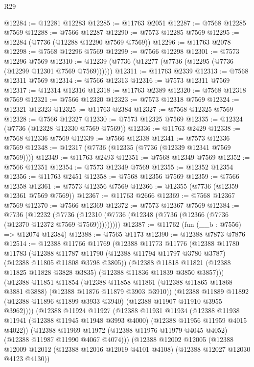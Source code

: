 \begin{lexlean}{R29}
\begin{coremodule}
@12284 := @12281 @12283
@12285 := @11763 @2051
@12287 := @7568 @12285 @7569
@12288 := @7566 @12287
@12290 := @7573 @12285 @7569
@12295 := @12284 (@7736 (@12288 @12290 @7569 @7569))
@12296 := @11763 @2078
@12298 := @7568 @12296 @7569
@12299 := @7566 @12298
@12301 := @7573 @12296 @7569
@12310 := @12239 (@7736 (@12277 (@7736 (@12295 (@7736 (@12299 @12301 @7569 @7569))))))
@12311 := @11763 @2339
@12313 := @7568 @12311 @7569
@12314 := @7566 @12313
@12316 := @7573 @12311 @7569
@12317 := @12314 @12316
@12318 := @11763 @2389
@12320 := @7568 @12318 @7569
@12321 := @7566 @12320
@12323 := @7573 @12318 @7569
@12324 := @12321 @12323
@12325 := @11763 @2384
@12327 := @7568 @12325 @7569
@12328 := @7566 @12327
@12330 := @7573 @12325 @7569
@12335 := @12324 (@7736 (@12328 @12330 @7569 @7569))
@12336 := @11763 @2429
@12338 := @7568 @12336 @7569
@12339 := @7566 @12338
@12341 := @7573 @12336 @7569
@12348 := @12317 (@7736 (@12335 (@7736 (@12339 @12341 @7569 @7569))))
@12349 := @11763 @2493
@12351 := @7568 @12349 @7569
@12352 := @7566 @12351
@12354 := @7573 @12349 @7569
@12355 := @12352 @12354
@12356 := @11763 @2451
@12358 := @7568 @12356 @7569
@12359 := @7566 @12358
@12361 := @7573 @12356 @7569
@12366 := @12355 (@7736 (@12359 @12361 @7569 @7569))
@12367 := @11763 @2666
@12369 := @7568 @12367 @7569
@12370 := @7566 @12369
@12372 := @7573 @12367 @7569
@12384 := @7736
    (@12232 (@7736 (@12310 (@7736 (@12348 (@7736 (@12366 (@7736 (@12370 @12372 @7569 @7569)))))))))
@12387 := @11762 (fun (__b : @7556) => @12074 @12384)
@12388 := @7565 @1173
@12390 := @12388 @7873 @7876
@12514 := @12388
    @11766
    @11769
    (@12388
      @11773
      @11776
      (@12388
        @11780
        @11783
        (@12388 @11787 @11790 (@12388 @11794 @11797 @3780 @3787) (@12388 @11805 @11808 @3798 @3805))
        (@12388
          @11818
          @11821
          (@12388 @11825 @11828 @3828 @3835)
          (@12388 @11836 @11839 @3850 @3857)))
      (@12388
        @11851
        @11854
        (@12388 @11858 @11861 (@12388 @11865 @11868 @3881 @3888) (@12388 @11876 @11879 @3903 @3910))
        (@12388
          @11889
          @11892
          (@12388 @11896 @11899 @3933 @3940)
          (@12388 @11907 @11910 @3955 @3962))))
    (@12388
      @11924
      @11927
      (@12388
        @11931
        @11934
        (@12388 @11938 @11941 (@12388 @11945 @11948 @3993 @4000) (@12388 @11956 @11959 @4015 @4022))
        (@12388
          @11969
          @11972
          (@12388 @11976 @11979 @4045 @4052)
          (@12388 @11987 @11990 @4067 @4074)))
      (@12388
        @12002
        @12005
        (@12388 @12009 @12012 (@12388 @12016 @12019 @4101 @4108) (@12388 @12027 @12030 @4123 @4130))

\end{coremodule}
\end{lexlean}
